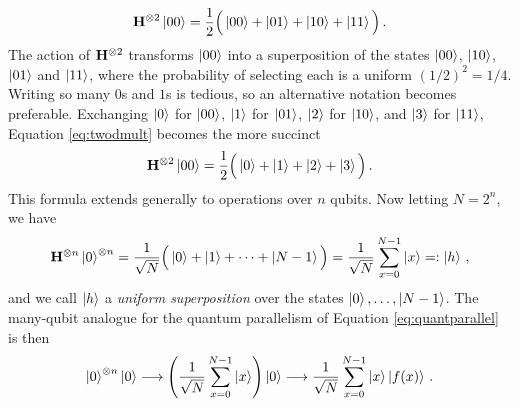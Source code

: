 \documentclass[12pt]{article} %
\begin{document}
\begin{align}\label{eq:twodmult}
	\mathbf{H}^{\otimes2} \ket{00} = \frac{1}{2}\Big(\ket{00} + \ket{01} + \ket{10} + \ket{11}\Big) \, .
\end{align}
The action of $\mathbf{H}^{\otimes2}$ transforms $\ket{00}$ into a superposition of the states $\ket{00}$, $\ket{10}$, $\ket{01}$ and $\ket{11}$, where the probability of selecting each is a uniform $(1/2)^2=1/4$. Writing so many $0$s and $1$s is tedious, so an alternative notation becomes preferable. Exchanging $\ket{0}$ for $\ket{00}$, $\ket{1}$ for $\ket{01}$, $\ket{2}$ for $\ket{10}$, and $\ket{3}$ for $\ket{11}$, Equation \eqref{eq:twodmult} becomes the more succinct
\begin{align*}
	\mathbf{H}^{\otimes2} \ket{00} = \frac{1}{2}\Big(\ket{0} + \ket{1} + \ket{2} + \ket{3}\Big) \, .
\end{align*}
This formula extends generally to operations over $n$ qubits.  Now letting $N=2^n$, we have
\begin{align*}%
	\H^{\otimes n} \ket{0}^{\otimes n} = \frac{1}{\sqrt{N}}\Big(\ket{0} + \ket{1} + \dots + \ket{N-1}\Big) =  \frac{1}{\sqrt{N}} \sum_{x=0}^{N-1} \ket{x}=:\ket{h} \, ,
\end{align*}
and we call $\ket{h}$ a \emph{uniform superposition} over the states $\ket{0},\dots,\ket{N-1}$. The many-qubit analogue for the quantum parallelism of Equation \eqref{eq:quantparallel} is then
\begin{align*}%
	\ket{0}^{\otimes n}\ket{0} \longrightarrow \left(\frac{1}{\sqrt{N}} \sum_{x=0}^{N-1} \ket{x} \right) \ket{0}  \longrightarrow \frac{1}{\sqrt{N}} \sum_{x=0}^{N-1} \ket{x} \ket{f(x)} \, .
\end{align*}




\end{document}
